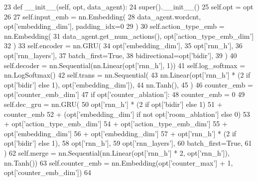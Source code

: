 \begin{DoxyCode}
23     \textcolor{keyword}{def }\_\_init\_\_(self, opt, data\_agent):
24         super().\_\_init\_\_()
25         self.opt = opt
26 
27         self.input\_emb = nn.Embedding(
28             data\_agent.wordcnt, opt[\textcolor{stringliteral}{'embedding\_dim'}], padding\_idx=0
29         )
30         self.action\_type\_emb = nn.Embedding(
31             data\_agent.get\_num\_actions(), opt[\textcolor{stringliteral}{'action\_type\_emb\_dim'}]
32         )
33         self.encoder = nn.GRU(
34             opt[\textcolor{stringliteral}{'embedding\_dim'}],
35             opt[\textcolor{stringliteral}{'rnn\_h'}],
36             opt[\textcolor{stringliteral}{'rnn\_layers'}],
37             batch\_first=\textcolor{keyword}{True},
38             bidirectional=opt[\textcolor{stringliteral}{'bidir'}],
39         )
40         self.decoder = nn.Sequential(nn.Linear(opt[\textcolor{stringliteral}{'rnn\_h'}], 1))
41         self.log\_softmax = nn.LogSoftmax()
42         self.trans = nn.Sequential(
43             nn.Linear(opt[\textcolor{stringliteral}{'rnn\_h'}] * (2 \textcolor{keywordflow}{if} opt[\textcolor{stringliteral}{'bidir'}] \textcolor{keywordflow}{else} 1), opt[\textcolor{stringliteral}{'embedding\_dim'}]),
44             nn.Tanh(),
45         )
46         counter\_emb = opt[\textcolor{stringliteral}{'counter\_emb\_dim'}]
47         \textcolor{keywordflow}{if} opt[\textcolor{stringliteral}{'counter\_ablation'}]:
48             counter\_emb = 0
49         self.dec\_gru = nn.GRU(
50             opt[\textcolor{stringliteral}{'rnn\_h'}] * (2 \textcolor{keywordflow}{if} opt[\textcolor{stringliteral}{'bidir'}] \textcolor{keywordflow}{else} 1)
51             + counter\_emb
52             + (opt[\textcolor{stringliteral}{'embedding\_dim'}] \textcolor{keywordflow}{if} \textcolor{keywordflow}{not} opt[\textcolor{stringliteral}{'room\_ablation'}] \textcolor{keywordflow}{else} 0)
53             + opt[\textcolor{stringliteral}{'action\_type\_emb\_dim'}]
54             + opt[\textcolor{stringliteral}{'action\_type\_emb\_dim'}]
55             + opt[\textcolor{stringliteral}{'embedding\_dim'}]
56             + opt[\textcolor{stringliteral}{'embedding\_dim'}]
57             + opt[\textcolor{stringliteral}{'rnn\_h'}] * (2 \textcolor{keywordflow}{if} opt[\textcolor{stringliteral}{'bidir'}] \textcolor{keywordflow}{else} 1),
58             opt[\textcolor{stringliteral}{'rnn\_h'}],
59             opt[\textcolor{stringliteral}{'rnn\_layers'}],
60             batch\_first=\textcolor{keyword}{True},
61         )
62         self.merge = nn.Sequential(nn.Linear(opt[\textcolor{stringliteral}{'rnn\_h'}] * 2, opt[\textcolor{stringliteral}{'rnn\_h'}]), nn.Tanh())
63         self.counter\_emb = nn.Embedding(opt[\textcolor{stringliteral}{'counter\_max'}] + 1, opt[\textcolor{stringliteral}{'counter\_emb\_dim'}])
64 
\end{DoxyCode}


